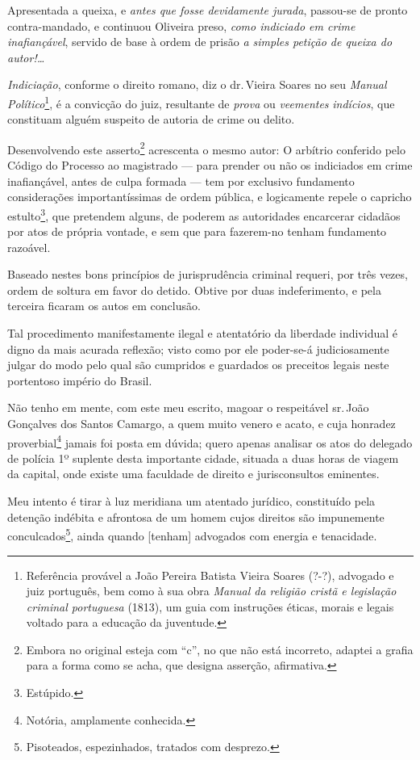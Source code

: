 Apresentada a queixa, e \emph{antes que fosse devidamente jurada},
passou-se de pronto contra-mandado, e continuou Oliveira preso,
\emph{como indiciado em crime inafiançável}, servido de base à ordem de
prisão \emph{a simples petição de queixa do autor!\ldots{}}

\emph{Indiciação}, conforme o direito romano, diz o dr.\,Vieira Soares no
seu \emph{Manual Político}\footnote{ Referência provável a João Pereira
  Batista Vieira Soares (?-?), advogado e juiz português, bem como à sua
  obra \emph{Manual da religião cristã e legislação criminal portuguesa}
  (1813), um guia com instruções éticas, morais e legais voltado para a
  educação da juventude.}, é a convicção do juiz, resultante de
\emph{prova} ou \emph{veementes} \emph{indícios}, que constituam alguém
suspeito de autoria de crime ou delito.

Desenvolvendo este asserto\footnote{ Embora no original esteja com ``c'',
  no que não está incorreto, adaptei a grafia para a forma como se acha,
  que designa asserção, afirmativa.} acrescenta o mesmo autor: O
arbítrio conferido pelo Código do Processo ao magistrado --- para prender
ou não os indiciados em crime inafiançável, antes de culpa formada ---
tem por exclusivo fundamento considerações importantíssimas de ordem
pública, e logicamente repele o capricho estulto\footnote{ Estúpido.},
que pretendem alguns, de poderem as autoridades encarcerar cidadãos por
atos de própria vontade, e sem que para fazerem-no tenham fundamento
razoável.

Baseado nestes bons princípios de jurisprudência criminal requeri, por
três vezes, ordem de soltura em favor do detido. Obtive por duas
indeferimento, e pela terceira ficaram os autos em conclusão.

Tal procedimento manifestamente ilegal e atentatório da liberdade
individual é digno da mais acurada reflexão; visto como por ele
poder-se-á judiciosamente julgar do modo pelo qual são cumpridos e
guardados os preceitos legais neste portentoso império do Brasil.

Não tenho em mente, com este meu escrito, magoar o respeitável sr.\,João
Gonçalves dos Santos Camargo, a quem muito venero e acato, e cuja
honradez proverbial\footnote{ Notória, amplamente conhecida.} jamais
foi posta em dúvida; quero apenas analisar os atos do delegado de
polícia 1º suplente desta importante cidade, situada a duas horas de
viagem da capital, onde existe uma faculdade de direito e jurisconsultos
eminentes.

Meu intento é tirar à luz meridiana um atentado jurídico, constituído
pela detenção indébita e afrontosa de um homem cujos direitos são
impunemente conculcados\footnote{ Pisoteados, espezinhados, tratados
  com desprezo.}, ainda quando {[}tenham{]} advogados com energia e
tenacidade.

